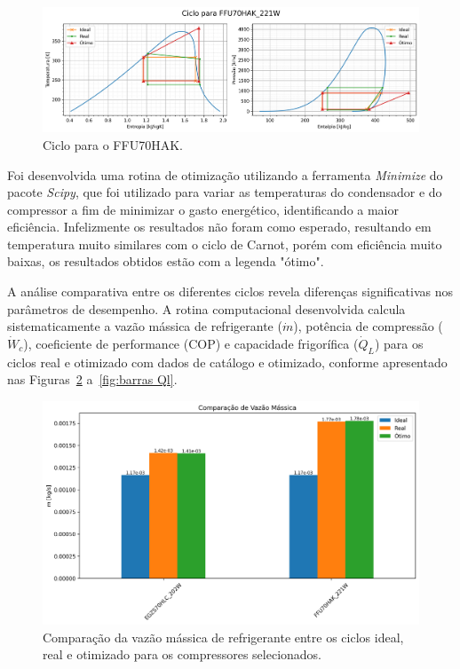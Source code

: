 \begin{figure}[ht]
    \centering
    \includegraphics[width=\linewidth]{Imagens/Desenvolvimento/ciclo_FFU70HAK_221W.png}
    \caption{Ciclo para o FFU70HAK.}
    \label{fig:ciclo comp 2}
\end{figure}



Foi desenvolvida uma rotina de otimização utilizando a ferramenta \textit{Minimize} do pacote \textit{Scipy}, que foi utilizado para variar as temperaturas do condensador e do compressor a fim de minimizar o gasto energético, identificando a maior eficiência. Infelizmente os resultados não foram como esperado, resultando em temperatura muito similares com o ciclo de Carnot, porém com eficiência muito baixas, os resultados obtidos estão com a legenda "ótimo".


A análise comparativa entre os diferentes ciclos revela diferenças significativas nos parâmetros de desempenho. A rotina computacional desenvolvida calcula sistematicamente a vazão mássica de refrigerante ($\dot{m}$), potência de compressão ($\dot{W}_c$), coeficiente de performance (COP) e capacidade frigorífica ($\dot{Q}_L$) para os ciclos real e otimizado com dados de catálogo e otimizado, conforme apresentado nas Figuras~\ref{fig:barras fluxo massa} a~\ref{fig:barras Ql}.

\begin{figure}[ht]
    \centering
    \includegraphics[width=0.8\linewidth]{Imagens/Desenvolvimento/barras_m.png}
    \caption{Comparação da vazão mássica de refrigerante entre os ciclos ideal, real e otimizado para os compressores selecionados.}
    \label{fig:barras fluxo massa}
\end{figure}


